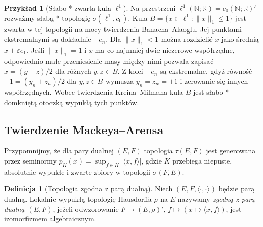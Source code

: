 \documentclass[11pt,a4paper]{article}
\numberwithin{equation}{section}
\theoremstyle{plain}
\theoremstyle{definition}
\newtheorem{definicja}[twierdzenie]{Definicja}
\newtheorem{przyklad}[twierdzenie]{Przykład}
\theoremstyle{remark}
\newcommand{\R}{\mathbb R}
\newcommand{\N}{\mathbb N}
\begin{document}
\begin{przyklad}[Słabo-* zwarta kula $\ell^1$]
\label{ex:krein-l1-weakstar9}
Na przestrzeni $\ell^1(\N;\R)=c_0(\N;\R)'$ rozważmy
słabą-* topologię $\sigma(\ell^1,c_0)$.
Kula $B=\{x\in\ell^1:\|x\|_1\le1\}$ jest zwarta
w tej topologii na mocy twierdzenia Banacha--Alaoglu.
Jej punktami ekstremalnymi są dokładnie $\pm e_n$.
Dla $\|x\|_1<1$ można rozdzielić $x$ jako średnią
$x\pm\varepsilon e_1$. Jeśli $\|x\|_1=1$ i $x$ ma
co najmniej dwie niezerowe współrzędne, odpowiednio małe
przeniesienie masy między nimi pozwala zapisać
$x=(y+z)/2$ dla różnych $y,z\in B$.
Z kolei $\pm e_n$ są ekstremalne, gdyż równość
$\pm1=(y_n+z_n)/2$ dla $y,z\in B$ wymusza
$y_n=z_n=\pm1$ i zerowanie się innych współrzędnych.
Wobec twierdzenia Kreina--Milmana kula $B$ jest słabo-*
domkniętą otoczką wypukłą tych punktów.
\end{przyklad}


\subsection{Twierdzenie Mackeya--Arensa}

Przypomnijmy, że dla pary dualnej $(E,F)$ topologia
$\tau(E,F)$ jest generowana przez seminormy
$p_K(x)=\sup_{f\in K}|\langle x,f\rangle|$, gdzie $K$
przebiega niepuste, absolutnie wypukłe i zwarte zbiory
w topologii $\sigma(F,E)$.

\begin{definicja}[Topologia zgodna z parą dualną]\label{def:compatible-duality}
Niech $(E,F,\langle\cdot,\cdot\rangle)$ będzie parą dualną.
Lokalnie wypukłą topologię Hausdorffa $\rho$ na $E$ nazywamy
\emph{zgodną z parą dualną $(E,F)$}, jeżeli odwzorowanie
$F\to(E,\rho)'$, $f\mapsto(x\mapsto\langle x,f\rangle)$,
jest izomorfizmem algebraicznym.
\end{definicja}
\end{document}
